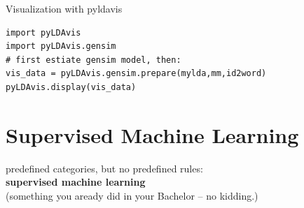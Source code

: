 \documentclass{beamer}
\begin{document}
\begin{frame}[fragile]{Visualization with pyldavis}
\begin{lstlisting}
import pyLDAvis
import pyLDAvis.gensim
# first estiate gensim model, then:
vis_data = pyLDAvis.gensim.prepare(mylda,mm,id2word)
pyLDAvis.display(vis_data)
\end{lstlisting}
\end{frame}







\section[Supervised ML]{Supervised Machine Learning}

\begin{frame}[plain]
predefined categories, but no predefined rules:\\ \textbf{supervised machine learning}\\
\vspace{1cm}\hspace{1cm}  \footnotesize{(something you aready did in your Bachelor -- no kidding.)}
\end{frame}
\end{document}
